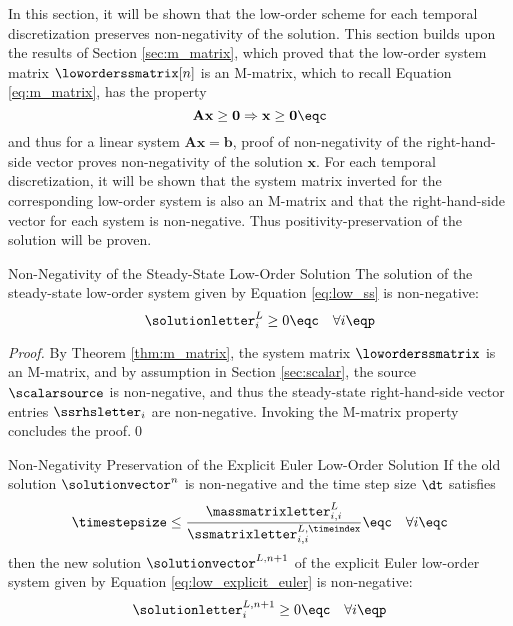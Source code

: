 In this section, it will be shown that the low-order scheme for each temporal
discretization preserves non-negativity of the solution. This section
builds upon the results of Section \ref{sec:m_matrix}, which proved that the
low-order system matrix $\loworderssmatrix[n]$ is an M-matrix, which to
recall Equation \eqref{eq:m_matrix}, has the property
\[
  \mathbf{A}\mathbf{x} \geq \mathbf{0} \Rightarrow \mathbf{x} \geq \mathbf{0} \eqc
\]
and thus for a linear system $\mathbf{A}\mathbf{x} = \mathbf{b}$,
proof of non-negativity of the right-hand-side vector proves non-negativity
of the solution $\mathbf{x}$. For each temporal discretization, it will be
shown that the system matrix inverted for the corresponding low-order system
is also an M-matrix and that the right-hand-side vector for each system is
non-negative. Thus positivity-preservation of the solution will be proven.
\begin{theorem}{Non-Negativity of the Steady-State Low-Order Solution}
  The solution of the steady-state low-order system given by Equation
  \eqref{eq:low_ss} is non-negative:
  \[
    \solutionletter^L_i \geq 0 \eqc \quad \forall i\eqp
  \]
\end{theorem}

\begin{proof}
By Theorem \ref{thm:m_matrix}, the system matrix $\loworderssmatrix$ is an
M-matrix, and by assumption in Section \ref{sec:scalar}, the source $\scalarsource$
is non-negative, and thus the steady-state right-hand-side vector entries
$\ssrhsletter_i$ are non-negative. Invoking the M-matrix property
concludes the proof.\qed
\end{proof}
\begin{theorem}{Non-Negativity Preservation of the Explicit Euler Low-Order Solution}
  If the old solution $\solutionvector^n$ is non-negative and
  the time step size $\dt$ satisfies
\begin{equation}\label{eq:explicit_cfl}
  \timestepsize \leq \frac{\massmatrixletter_{i,i}^{L}}
    {\ssmatrixletter_{i,i}^{L,\timeindex}}
  \eqc\quad\forall i \eqc
\end{equation}
  then the new solution $\solutionvector^{L,n+1}$ of the explicit Euler low-order
  system given by Equation \eqref{eq:low_explicit_euler} is non-negative:
  \[
    \solutionletter^{L,n+1}_i \geq 0 \eqc \quad \forall i\eqp
  \]
\end{theorem}

